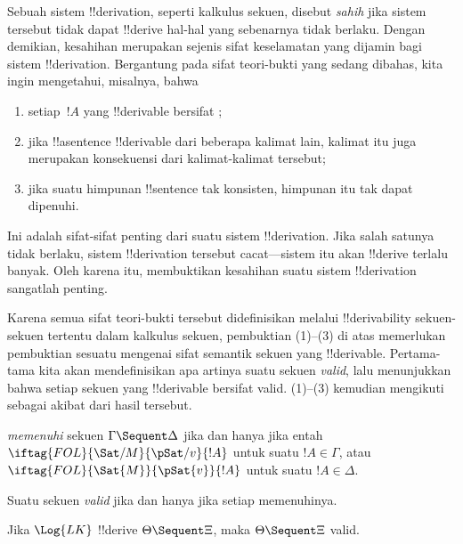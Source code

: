\documentclass[../../../include/open-logic-section]{subfiles}
\begin{document}
      {}
      {}


\begin{explain}
Sebuah sistem !!{derivation}, seperti kalkulus sekuen, disebut
\emph{sahih} jika sistem tersebut tidak dapat !!{derive} hal-hal yang
sebenarnya tidak berlaku. Dengan demikian, kesahihan merupakan sejenis
sifat keselamatan yang dijamin bagi sistem !!{derivation}. Bergantung pada sifat teori-bukti
yang sedang dibahas, kita ingin mengetahui, misalnya, bahwa
\begin{enumerate}
\item setiap~$!A$ yang !!{derivable} bersifat
  ;
\item jika !!a{sentence} !!{derivable} dari beberapa kalimat lain,
  kalimat itu juga merupakan konsekuensi dari kalimat-kalimat tersebut;
\item jika suatu himpunan !!{sentence} tak konsisten, himpunan itu tak
  dapat dipenuhi.
\end{enumerate}
Ini adalah sifat-sifat penting dari suatu sistem !!{derivation}. Jika salah
satunya tidak berlaku, sistem !!{derivation} tersebut cacat---sistem itu
akan !!{derive} terlalu banyak. Oleh karena itu, membuktikan kesahihan
suatu sistem !!{derivation} sangatlah penting.

Karena semua sifat teori-bukti tersebut didefinisikan melalui
!!{derivability} sekuen-sekuen tertentu dalam kalkulus sekuen, pembuktian
(1)--(3) di atas memerlukan pembuktian sesuatu mengenai sifat semantik
sekuen yang !!{derivable}. Pertama-tama kita akan mendefinisikan apa
artinya suatu sekuen \emph{valid}, lalu menunjukkan bahwa setiap sekuen
yang !!{derivable} bersifat valid. (1)--(3) kemudian mengikuti sebagai
akibat dari hasil tersebut.
\end{explain}

\begin{defn}
\emph{memenuhi} sekuen $\Gamma \Sequent \Delta$ jika dan hanya jika
entah $\iftag{FOL}{\Sat/{M}}{\pSat/{v}}{!A}$ untuk suatu
$!A \in \Gamma$, atau $\iftag{FOL}{\Sat{M}}{\pSat{v}}{!A}$ untuk suatu
$!A \in \Delta$.

Suatu sekuen \emph{valid} jika dan hanya jika setiap
memenuhinya.
\end{defn}

\begin{thm}[Kesahihan]
 Jika $\Log{LK}$ !!{derive}
$\Theta \Sequent \Xi$, maka $\Theta \Sequent \Xi$ valid.
\end{thm}
\end{document}

